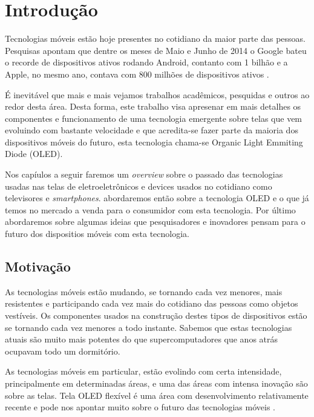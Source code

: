 \chapter{Introdução}
\label{cap:introducao}

Tecnologias móveis estão hoje presentes no cotidiano da maior parte das pessoas. Pesquisas apontam que dentre os meses de Maio e Junho de 2014 o Google bateu o recorde de dispositivos ativos rodando Android, contanto com 1 bilhão e a Apple, no mesmo ano, contava com 800 milhões de dispositivos ativos \cite{ResumoGoogleIOBAM:2014}. 

É inevitável que mais e mais vejamos trabalhos acadêmicos, pesquidas e outros ao redor desta área. Desta forma, este trabalho visa apresenar em mais detalhes os componentes e funcionamento de uma tecnologia emergente sobre telas que vem evoluindo com bastante velocidade e que acredita-se fazer parte da maioria dos dispositivos móveis do futuro, esta tecnologia chama-se Organic Light Emmiting Diode (OLED).

Nos capíulos a seguir faremos um \textit{overview} sobre o passado das tecnologias usadas nas telas de eletroeletrônicos e devices usados no cotidiano como televisores e \textit{smartphones}. abordaremos então sobre a tecnologia OLED e o que já temos no mercado a venda para o consumidor com esta tecnologia. Por último abordaremos sobre algumas ideias que pesquisadores e inovadores pensam para o futuro dos dispositios móveis com esta tecnologia. 


\section{Motivação}
\label{sec:motivacao}

As tecnologias móveis estão mudando, se tornando cada vez menores, mais resistentes e participando cada vez mais do cotidiano das pessoas como objetos vestíveis. Os componentes usados na construção destes tipos de dispositivos estão se tornando cada vez menores a todo instante. Sabemos que estas tecnologias atuais são muito mais potentes do que supercomputadores que anos atrás ocupavam todo um dormitório.

As tecnologias móveis em particular, estão evolindo com certa intensidade, principalmente em determinadas áreas, e uma das áreas com intensa inovação são sobre as telas. Tela OLED flexível é uma área com desenvolvimento relativamente recente e pode nos apontar muito sobre o futuro das tecnologias móveis \cite{FOLEDDRS:2014}.


